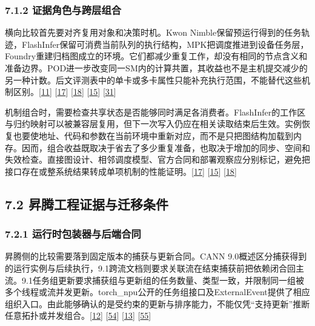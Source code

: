 \documentclass[
  11pt,
  UTF8]{ctexart}
\begin{document}
\hypertarget{section-7-1-2}{%
\subsubsection{7.1.2 证据角色与跨层组合}\label{section-7-1-2}}

横向比较首先要对齐复用对象和决策时机。Kwon
Nimble保留预运行得到的任务轨迹，FlashInfer保留可消费当前队列的执行结构，MPK把调度推进到设备任务层，Foundry重建归档图成立的环境。它们都减少重复工作，却没有相同的节点含义和准备边界。POD进一步改变同一SM内的计算共置，其收益也不是主机提交减少的另一种计数。后文评测表中的单卡或多卡属性只能补充执行范围，不能替代这些机制区别。{[}\protect\hyperlink{ref-kwon2020nimble}{11}{]}
{[}\protect\hyperlink{ref-ye2025flashinfer}{17}{]}
{[}\protect\hyperlink{ref-cheng2026mpk}{18}{]}
{[}\protect\hyperlink{ref-liu2026foundry}{15}{]}
{[}\protect\hyperlink{ref-kamath2025pod}{31}{]}

机制组合时，需要检查共享状态是否能够同时满足各消费者。FlashInfer的工作区与归约映射可以被兼容层复用，但下一次写入仍应在相关读取结束后生效。实例恢复也要使地址、代码和参数在当前环境中重新对应，而不是只把图结构加载到内存。因而，组合收益既取决于省去了多少重复准备，也取决于增加的同步、空间和失效检查。直接图设计、相邻调度模型、官方合同和部署观察应分别标记，避免把接口存在或整系统结果转成单项机制的性能证明。{[}\protect\hyperlink{ref-ye2025flashinfer}{17}{]}
{[}\protect\hyperlink{ref-liu2026foundry}{15}{]}
{[}\protect\hyperlink{ref-cheng2026mpk}{18}{]}

\hypertarget{section-7-2}{%
\subsection{7.2 昇腾工程证据与迁移条件}\label{section-7-2}}

\hypertarget{section-7-2-1}{%
\subsubsection{7.2.1 运行时包装器与后端合同}\label{section-7-2-1}}

昇腾侧的比较需要落到固定版本的捕获与更新合同。CANN
9.0概述区分捕获得到的运行实例与后续执行，9.1跨流文档则要求关联流在结束捕获前把依赖闭合回主流。9.1任务组更新要求捕获组与更新组的任务数量、类型一致，并限制同一组被多个线程或流并发更新。torch\_npu公开的任务组接口及ExternalEvent提供了相应组织入口。由此能够确认的是受约束的更新与排序能力，不能仅凭``支持更新''推断任意拓扑或并发组合。{[}\protect\hyperlink{ref-cann900overview}{12}{]}
{[}\protect\hyperlink{ref-cann910multi}{54}{]}
{[}\protect\hyperlink{ref-cann910update}{13}{]}
{[}\protect\hyperlink{ref-gitee20264}{55}{]}
\end{document}
